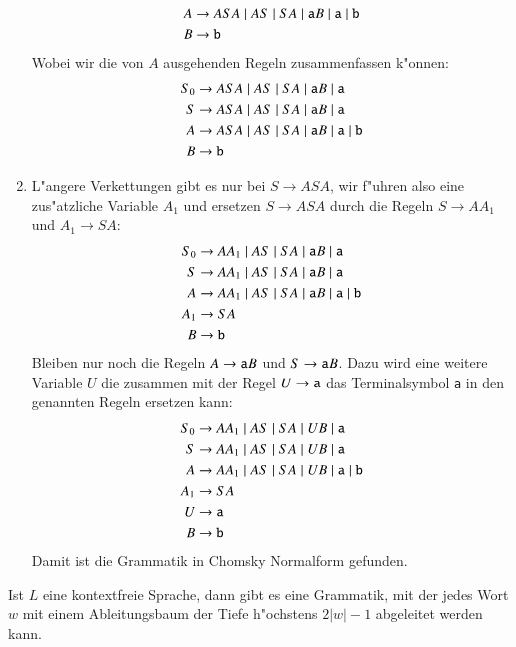 \begin{enumerate}
\begin{align*}
A&\to ASA \;|\; AS \;|\; SA \;|\; {\tt a}B\;|\;{\tt a}\;|\;{\tt b}\\
B&\to{\tt b}
\end{align*}
Wobei wir die von $A$ ausgehenden Regeln zusammenfassen k"onnen:
\begin{align*}
S_0&\to ASA \;|\; AS \;|\; SA \;|\; {\tt a}B\;|\;{\tt a}\\
S&\to ASA \;|\; AS \;|\; SA \;|\; {\tt a}B\;|\;{\tt a}\\
A&\to ASA \;|\; AS \;|\; SA \;|\; {\tt a}B\;|\;{\tt a}\;|\; {\tt b}\\
B&\to{\tt b}
\end{align*}
\item L"angere Verkettungen gibt es nur bei $S\to ASA$, wir f"uhren
also eine zus"atzliche Variable $A_1$ und ersetzen $S\to ASA$ durch
die Regeln $S\to AA_1$ und $A_1\to SA$:
\begin{align*}
S_0&\to AA_1 \;|\; AS \;|\; SA \;|\; {\tt a}B\;|\;{\tt a}\\
S&\to AA_1 \;|\; AS \;|\; SA \;|\; {\tt a}B\;|\;{\tt a}\\
A&\to AA_1 \;|\; AS \;|\; SA \;|\; {\tt a}B\;|\;{\tt a} \;|\; {\tt b}\\
A_1&\to SA\\
B&\to{\tt b}\\
\end{align*}
Bleiben nur noch die Regeln $A\to{\tt a}B$ und $S\to{\tt a}B$. Dazu
wird eine weitere Variable $U$ die zusammen mit der Regel $U\to{\tt a}$
das Terminalsymbol {\tt a} in den genannten Regeln ersetzen kann:
\begin{align*}
S_0&\to AA_1 \;|\; AS \;|\; SA \;|\; UB\;|\;{\tt a}\\
S&\to AA_1 \;|\; AS \;|\; SA \;|\; UB\;|\;{\tt a}\\
A&\to AA_1 \;|\; AS \;|\; SA \;|\; UB\;|\;{\tt a} \;|\; {\tt b}\\
A_1&\to SA\\
U&\to {\tt a}\\
B&\to{\tt b}\\
\end{align*}
Damit ist die Grammatik in Chomsky Normalform gefunden.
\end{enumerate}

\begin{satz}
Ist $L$ eine kontextfreie Sprache, dann gibt es eine Grammatik,
mit der jedes Wort $w$ mit einem Ableitungsbaum der Tiefe h"ochstens
$2|w|-1$ abgeleitet werden kann.
\end{satz}

